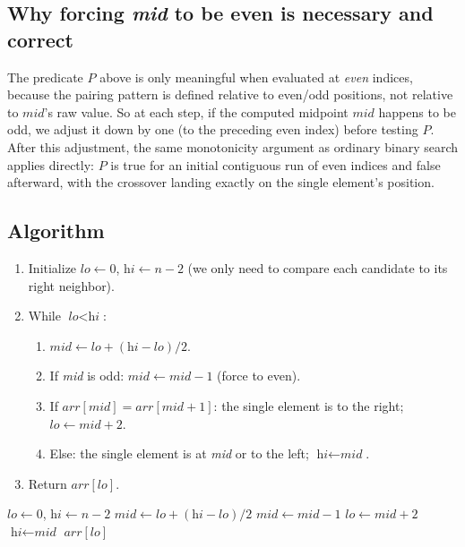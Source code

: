 \subsection*{Why forcing \textit{mid} to be even is necessary and correct}

The predicate $P$ above is only meaningful when evaluated at \emph{even}
indices, because the pairing pattern is defined relative to even/odd
positions, not relative to $\textit{mid}$'s raw value. So at each step, if
the computed midpoint $\textit{mid}$ happens to be odd, we adjust it down
by one (to the preceding even index) before testing $P$. After this
adjustment, the same monotonicity argument as ordinary binary search
applies directly: $P$ is true for an initial contiguous run of even
indices and false afterward, with the crossover landing exactly on the
single element's position.

\subsection*{Algorithm}

\begin{enumerate}
  \item Initialize $\textit{lo} \gets 0$, $\textit{hi} \gets n-2$
        (we only need to compare each candidate to its right neighbor).
  \item While $\textit{lo} < \textit{hi}$:
  \begin{enumerate}
    \item $\textit{mid} \gets \textit{lo}+(\textit{hi}-\textit{lo})/2$.
    \item If \textit{mid} is odd: $\textit{mid} \gets \textit{mid}-1$
          (force to even).
    \item If $\textit{arr}[\textit{mid}] = \textit{arr}[\textit{mid}+1]$:
          the single element is to the right; $\textit{lo} \gets
          \textit{mid}+2$.
    \item Else: the single element is at \textit{mid} or to the left;
          $\textit{hi} \gets \textit{mid}$.
  \end{enumerate}
  \item Return $\textit{arr}[\textit{lo}]$.
\end{enumerate}

\begin{algorithm}[H]
\caption{Single Element in a Sorted Array}
\begin{algorithmic}[1]
  \State $\textit{lo} \gets 0$, $\textit{hi} \gets n-2$
    \State $\textit{mid} \gets \textit{lo}+(\textit{hi}-\textit{lo})/2$
      \State $\textit{mid} \gets \textit{mid} - 1$
    \EndIf
      \State $\textit{lo} \gets \textit{mid} + 2$
    \Else
      \State $\textit{hi} \gets \textit{mid}$
    \EndIf
  \EndWhile
  \State \Return $\textit{arr}[\textit{lo}]$
\EndProcedure
\end{algorithmic}
\end{algorithm}

